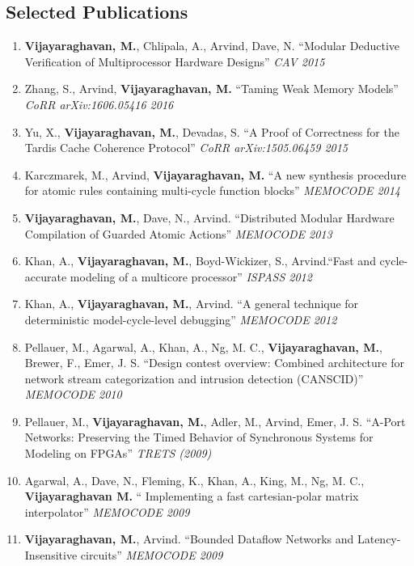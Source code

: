 \documentclass[margin]{resume}
\begin{document}
\begin{resume}
    \section{\mysidestyle Selected Publications}
    \begin{enumerate}
    \item \textbf{Vijayaraghavan, M.}, Chlipala, A., Arvind, Dave, N.
    ``Modular Deductive Verification of Multiprocessor Hardware Designs'' \textit{CAV 2015}
    \item 
    Zhang, S., Arvind, \textbf{Vijayaraghavan, M.} ``Taming Weak Memory Models'' \textit{CoRR arXiv:1606.05416 2016}
    \item Yu, X., \textbf{Vijayaraghavan, M.}, Devadas, S.
    ``A Proof of Correctness for the Tardis Cache Coherence Protocol'' \textit{CoRR arXiv:1505.06459 2015}
    \item Karczmarek, M., Arvind, \textbf{Vijayaraghavan, M.}
    ``A new synthesis procedure for atomic rules containing multi-cycle function blocks'' \textit{MEMOCODE 2014}
    \item \textbf{Vijayaraghavan, M.}, Dave, N., Arvind.
    ``Distributed Modular Hardware Compilation of Guarded Atomic Actions'' \textit{MEMOCODE 2013}
    \item Khan, A., \textbf{Vijayaraghavan, M.}, Boyd-Wickizer, S., Arvind.``Fast and cycle-accurate modeling of 
    a multicore processor''
    \textit {ISPASS 2012}
    \item Khan, A., \textbf{Vijayaraghavan, M.}, Arvind. ``A general technique for deterministic model-cycle-level debugging''
    \textit{MEMOCODE 2012}
    \item Pellauer, M., Agarwal, A., Khan, A., Ng, M. C., \textbf{Vijayaraghavan, M.}, Brewer, F., Emer, J. S. 
    ``Design contest overview: Combined architecture for network stream categorization and intrusion detection (CANSCID)''
    \textit{MEMOCODE 2010}
    \item Pellauer, M., \textbf{Vijayaraghavan, M.}, Adler, M., Arvind, Emer, J. S.
    ``A-Port Networks: Preserving the Timed Behavior of Synchronous Systems for
    Modeling on FPGAs'' \textit{TRETS (2009)}
    \item Agarwal, A., Dave, N., Fleming, K., Khan, A., King, M., Ng, M. C., \textbf{Vijayaraghavan M.} ``
    Implementing a fast cartesian-polar matrix interpolator'' \textit{MEMOCODE 2009}
    \item \textbf{Vijayaraghavan, M.}, Arvind. ``Bounded Dataflow Networks and
    Latency-Insensitive circuits'' \textit{MEMOCODE 2009}

\end{enumerate}
\end{resume}
\end{document}
